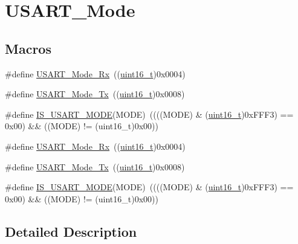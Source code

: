 \hypertarget{group___u_s_a_r_t___mode}{}\section{U\+S\+A\+R\+T\+\_\+\+Mode}
\label{group___u_s_a_r_t___mode}
\subsection*{Macros}
\begin{DoxyCompactItemize}
\item 
\#define \hyperlink{group___u_s_a_r_t___mode_gafefcc3d3c1a1f83b425784fa6289aecf}{U\+S\+A\+R\+T\+\_\+\+Mode\+\_\+\+Rx}~((\hyperlink{_p_e___types_8h_a1f1825b69244eb3ad2c7165ddc99c956}{uint16\+\_\+t})0x0004)
\item 
\#define \hyperlink{group___u_s_a_r_t___mode_ga22b2813509a062435ea68d086ec565b4}{U\+S\+A\+R\+T\+\_\+\+Mode\+\_\+\+Tx}~((\hyperlink{_p_e___types_8h_a1f1825b69244eb3ad2c7165ddc99c956}{uint16\+\_\+t})0x0008)
\item 
\#define \hyperlink{group___u_s_a_r_t___mode_gae9140e5ca405d2377fe0e82c79e136a2}{I\+S\+\_\+\+U\+S\+A\+R\+T\+\_\+\+M\+O\+DE}(M\+O\+DE)~((((M\+O\+DE) \& (\hyperlink{_p_e___types_8h_a1f1825b69244eb3ad2c7165ddc99c956}{uint16\+\_\+t})0x\+F\+F\+F3) == 0x00) \&\& ((\+M\+O\+D\+E) != (uint16\+\_\+t)0x00))
\item 
\#define \hyperlink{group___u_s_a_r_t___mode_gafefcc3d3c1a1f83b425784fa6289aecf}{U\+S\+A\+R\+T\+\_\+\+Mode\+\_\+\+Rx}~((\hyperlink{_p_e___types_8h_a1f1825b69244eb3ad2c7165ddc99c956}{uint16\+\_\+t})0x0004)
\item 
\#define \hyperlink{group___u_s_a_r_t___mode_ga22b2813509a062435ea68d086ec565b4}{U\+S\+A\+R\+T\+\_\+\+Mode\+\_\+\+Tx}~((\hyperlink{_p_e___types_8h_a1f1825b69244eb3ad2c7165ddc99c956}{uint16\+\_\+t})0x0008)
\item 
\#define \hyperlink{group___u_s_a_r_t___mode_gae9140e5ca405d2377fe0e82c79e136a2}{I\+S\+\_\+\+U\+S\+A\+R\+T\+\_\+\+M\+O\+DE}(M\+O\+DE)~((((M\+O\+DE) \& (\hyperlink{_p_e___types_8h_a1f1825b69244eb3ad2c7165ddc99c956}{uint16\+\_\+t})0x\+F\+F\+F3) == 0x00) \&\& ((\+M\+O\+D\+E) != (uint16\+\_\+t)0x00))
\end{DoxyCompactItemize}


\subsection{Detailed Description}


